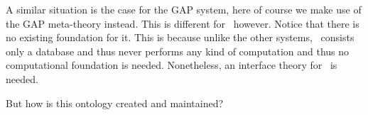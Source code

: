 \begin{description}
    A similar situation is the case for the GAP system, here of course we make use of the GAP meta-theory instead. 
    This is different for \lmfdb\ however. 
    Notice that there is no existing foundation for it. 
    This is because unlike the other systems, \lmfdb\ consists only a database and thus never performs any kind of computation and thus no computational foundation is needed. 
    Nonetheless, an interface theory for \lmfdb\ is needed. 
    
\end{description}

But how is this ontology created and maintained?

